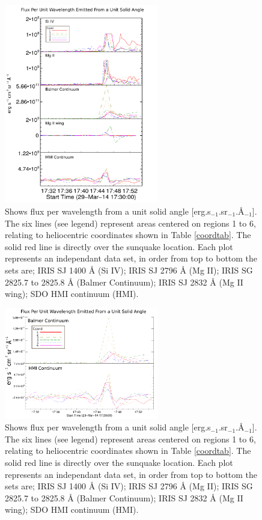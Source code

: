 \begin{figure}[H]
  \begin{center}
  \includegraphics[width=0.6\textwidth]{29-Mar-14-Flux-Ladder}
  \end{center}
  \caption{Shows flux per wavelength from a unit solid angle [erg.s$_{-1}$.sr$_{-1}$.Å$_{-1}$]. The six lines (see legend) represent areas centered on regions 1 to 6, relating to heliocentric coordinates shown in Table \ref{coordtab}. The solid red line is directly over the sunquake location. Each plot represents an independant data set, in order from top to bottom the sets are; IRIS SJ 1400 Å (Si IV); IRIS SJ 2796 Å (Mg II); IRIS SG  2825.7 to 2825.8 Å (Balmer Continuum); IRIS SJ 2832 Å (Mg II wing); SDO HMI continuum (HMI).}\label{fluxladder}
\end{figure}




\begin{figure}[H]
  \begin{center}
  \includegraphics[width=0.6\textwidth]{29-Mar-14-Flux-Ladder-Balm-HMI-Only}
  \end{center}
  \caption{Shows flux per wavelength from a unit solid angle [erg.s$_{-1}$.sr$_{-1}$.Å$_{-1}$]. The six lines (see legend) represent areas centered on regions 1 to 6, relating to heliocentric coordinates shown in Table \ref{coordtab}. The solid red line is directly over the sunquake location. Each plot represents an independant data set, in order from top to bottom the sets are; IRIS SJ 1400 Å (Si IV); IRIS SJ 2796 Å (Mg II); IRIS SG  2825.7 to 2825.8 Å (Balmer Continuum); IRIS SJ 2832 Å (Mg II wing); SDO HMI continuum (HMI).}\label{fluxladder-balm-hmi-only}
\end{figure}



